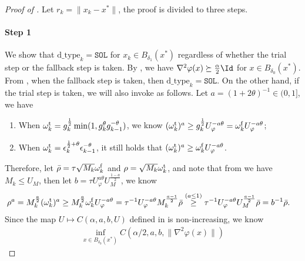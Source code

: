 \begin{proof}[Proof of ]
    Let $r_k = \| x_k - x^* \|$, the proof is divided to three steps.

    \paragraph{Step 1}
    We show that $\text{d\_type}_k = \texttt{SOL}$ for $x_k \in B_{\delta_1}(x^*)$ regardless of whether the trial step or the fallback step is taken.
    By , we have
     $\nabla^2\varphi(x) \succeq \frac{\alpha}{2} \Id$ 
    for $x \in B_{\delta_0}(x^*)$.
    From , 
    when the fallback step is taken, then $\text{d\_type}_k = \texttt{SOL}$.
    On the other hand, if the trial step is taken, 
    we will also invoke  as follows.
    Let $a = (1 + 2\theta)^{-1} \in (0, 1]$, we have
    \begin{enumerate}
        \item When $\omega^{\mathrm{t}}_k = g_k^{\frac{1}{2}} \min(1, g_k^\theta g_{k-1}^{-\theta})$, 
        we know  $(\omega^{\mathrm{t}}_k)^a \geq g_k^{\frac{1}{2}} U_\varphi^{-a\theta} = \omega_k^{\mathrm{f}} U_\varphi^{-a\theta}$;
        \item When $\omega^{\mathrm{t}}_k = \epsilon_k^{\frac{1}{2} + \theta} \epsilon_{k-1}^{-\theta}$, 
        it still holds that $(\omega^{\mathrm{t}}_k)^a\geq \omega_k^{\mathrm{f}} U_\varphi^{-a\theta}$.
    \end{enumerate}
    Therefore, let $\bar\rho = \tau \sqrt{M_k}\omega_k^{\mathrm{f}}$ and $\rho = \sqrt{M_k} \omega_k^{\mathrm{t}}$, 
    and note that from  we have $M_k \leq  U_M$, 
    then let $b = \tau U_\varphi^{a\theta} U_M^{\frac{1-a}{2}}$, we know
    \begin{align*}
        \rho^a &= M_k^{\frac{a}{2}} (\omega_k^{\mathrm{t}})^a
        \geq M_k^{\frac{a}{2}} \omega_k^{\mathrm{f}} U_{\varphi}^{-a\theta}
        =  \tau^{-1} U_{\varphi}^{-a\theta} M_k^{\frac{a-1}{2}} \bar \rho
        \overset{(a \leq 1)}{\geq}
        \tau^{-1} U_{\varphi}^{-a\theta} U_M^{\frac{a-1}{2}} \bar \rho
        = b^{-1} \bar \rho.
    \end{align*}
    Since the map $U \mapsto C(\alpha, a, b, U)$ defined in  is non-increasing, 
    we know 
    \begin{align*}
    \inf_{x\in B_{\delta_0}(x^*)} C(\alpha / 2, a, b, \|\nabla^2\varphi(x)\|)

\end{align*}
\end{proof}

